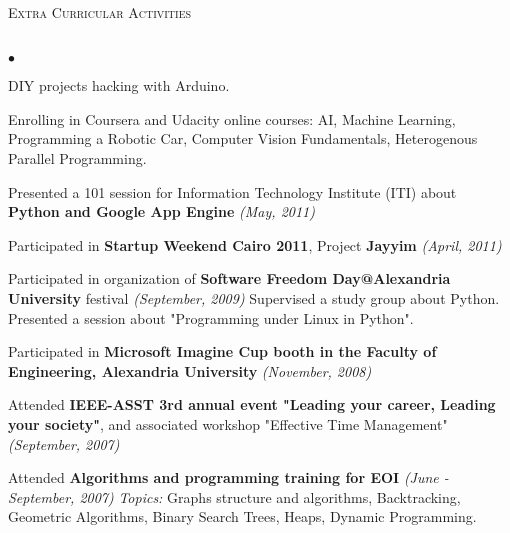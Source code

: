 \documentclass[letterpaper,12pt]{article}
\newcommand{\lineunder}{\vspace*{-8pt} \\ \hspace*{-8pt} \hrulefill \\}
\newcommand{\interval}[1] { \textit{(#1)} }
\newcommand{\header}[1]{{\hspace*{0pt}\vspace*{6pt} \textsc{#1}} \vspace*{-6pt} \lineunder}
\newenvironment{achievements}{\begin{list}{$\bullet$}{\topsep 0pt \itemsep -2pt}}{\vspace*{4pt}\end{list}}
\begin{document}
\header{Extra Curricular Activities}
\begin{achievements}
  \item DIY projects hacking with Arduino.
  \item Enrolling in Coursera and Udacity online courses: AI, Machine Learning, Programming a Robotic Car, Computer Vision Fundamentals, Heterogenous Parallel Programming.
  \item Presented a 101 session for Information Technology Institute (ITI) about \textbf{Python and Google App Engine} \interval{May, 2011}
  \item Participated in \textbf{Startup Weekend Cairo 2011}, Project \textbf{Jayyim} \interval{April, 2011}
  \item Participated in organization of \textbf{Software Freedom Day@Alexandria University} festival \interval{September, 2009}
    \subitem Supervised a study group about Python.
    \subitem Presented a session about "Programming under Linux in Python".
  \item Participated in \textbf{Microsoft Imagine Cup booth in the Faculty of Engineering, Alexandria University} \interval{November, 2008}
  \item Attended \textbf{IEEE-ASST 3rd annual event "Leading your career, Leading your society"}, and associated workshop "Effective Time Management" \interval{September, 2007}
  \item Attended \textbf{Algorithms and programming training for EOI} \interval{June - September, 2007}
    \subitem \textit{Topics:} Graphs structure and algorithms, Backtracking, Geometric Algorithms, Binary Search Trees, Heaps, Dynamic Programming.
\end{achievements}
\end{document}
